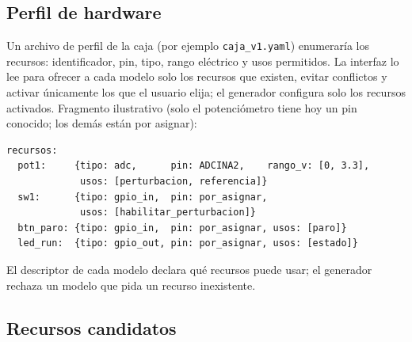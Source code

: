 \documentclass[12pt,letterpaper]{article}
\begin{document}
\subsection{Perfil de hardware}

Un archivo de perfil de la caja (por ejemplo \texttt{caja\_v1.yaml}) enumeraría los recursos: identificador, pin, tipo, rango eléctrico y usos permitidos. La interfaz lo lee para ofrecer a cada modelo solo los recursos que existen, evitar conflictos y activar únicamente los que el usuario elija; el generador configura solo los recursos activados. Fragmento ilustrativo (solo el potenciómetro tiene hoy un pin conocido; los demás están por asignar):

\begin{lstlisting}
recursos:
  pot1:     {tipo: adc,      pin: ADCINA2,    rango_v: [0, 3.3],
             usos: [perturbacion, referencia]}
  sw1:      {tipo: gpio_in,  pin: por_asignar,
             usos: [habilitar_perturbacion]}
  btn_paro: {tipo: gpio_in,  pin: por_asignar, usos: [paro]}
  led_run:  {tipo: gpio_out, pin: por_asignar, usos: [estado]}
\end{lstlisting}

El descriptor de cada modelo declara qué recursos puede usar; el generador rechaza un modelo que pida un recurso inexistente.

\subsection{Recursos candidatos}
\end{document}
